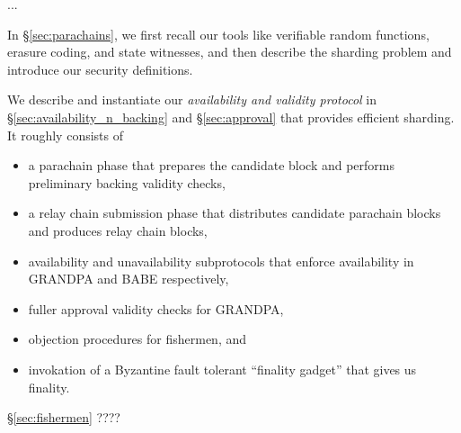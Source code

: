 

...



In \S\ref{sec:parachains}, we first recall our tools like verifiable random functions, erasure coding, and state witnesses, and then describe the sharding problem and introduce our security definitions. 

We describe and instantiate our {\em availability and validity protocol} in \S\ref{sec:availability_n_backing} and \S\ref{sec:approval} that provides efficient sharding.  It roughly consists of 
\begin{itemize}
\item a parachain phase that prepares the candidate block and performs preliminary backing validity checks,
\item a relay chain submission phase that distributes candidate parachain blocks and produces relay chain blocks,
\item availability and unavailability subprotocols that enforce availability in GRANDPA and BABE respectively,
\item fuller approval validity checks for GRANDPA,
\item objection procedures for fishermen, and
\item invokation of a Byzantine fault tolerant ``finality gadget'' that gives us finality.
\end{itemize}

\S\ref{sec:fishermen}  ????
